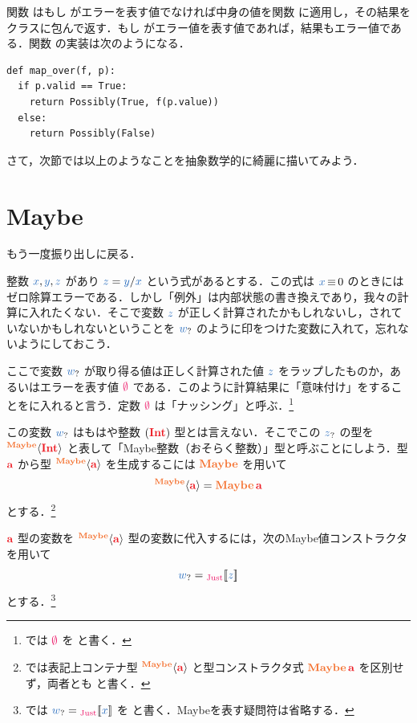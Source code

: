 \documentclass[a5paper,twoside,fleqn,draft]{jsbook}
\begin{document}
関数  はもし  がエラーを表す値でなければ中身の値を関数  に適用し，その結果を  クラスに包んで返す．もし  がエラー値を表す値であれば，結果もエラー値である．関数  の実装は次のようになる．
\begin{pythoncode}
\begin{verbatim}
def map_over(f, p):
  if p.valid == True:
    return Possibly(True, f(p.value))
  else:
    return Possibly(False)
\end{verbatim}
\end{pythoncode}

さて，次節では以上のようなことを抽象数学的に綺麗に描いてみよう．

\section{Maybe}

もう一度振り出しに戻る．

整数 $\hVar{x},\hVar{y},\hVar{z}$ があり $\hVar{z}=\hVar{y}/\hVar{x}$ という式があるとする．この式は $\hVar{x}\hIfEq0$ のときにはゼロ除算エラーである．しかし「例外」は内部状態の書き換えであり，我々の計算に入れたくない．そこで変数 $\hVar{z}$ が正しく計算されたかもしれないし，されていないかもしれないということを $\hMaybeVar{w}$ のように印をつけた変数に入れて，忘れないようにしておこう．

ここで変数 $\hMaybeVar{w}$ が取り得る値は正しく計算された値 $\hVar{z}$ をラップしたものか，あるいはエラーを表す値 $\hNothing$ である．このように計算結果に「意味付け」をすることをに入れると言う．定数 $\hNothing$ は「ナッシング」と呼ぶ．\footnote{\haskell では $\hNothing$ を  と書く．}

この変数 $\hMaybeVar{w}$ はもはや整数 $(\hInt)$ 型とは言えない．そこでこの $\hMaybeVar{z}$ の型を $\hMaybeConstruct{\hInt}$ と表して「Maybe整数（おそらく整数）」型と呼ぶことにしよう．型 $\hTypeName{a}$ から型 $\hMaybeConstruct{\hTypeName{a}}$ を生成するこには $\hMaybe$ を用いて
\begin{equation}
  \hMaybeConstruct{\hTypeName{a}}
  =\hMaybe\,\hTypeName{a}
\end{equation}
とする．\footnote{\haskell では表記上コンテナ型 $\hMaybeConstruct{\hTypeName{a}}$ と型コンストラクタ式 $\hMaybe\,\hTypeName{a}$ を区別せず，両者とも  と書く．}

$\hTypeName{a}$ 型の変数を $\hMaybeConstruct{\hTypeName{a}}$ 型の変数に代入するには，次のMaybe値コンストラクタを用いて
\begin{equation}
  \hMaybeVar{w}
  =\hJustWith{\hVar{z}}
\end{equation}
とする．\footnote{\haskell では $\hMaybeVar{w}=\hJustWith{\hVar{x}}$ を  と書く．Maybeを表す疑問符は省略する．}
\end{document}
